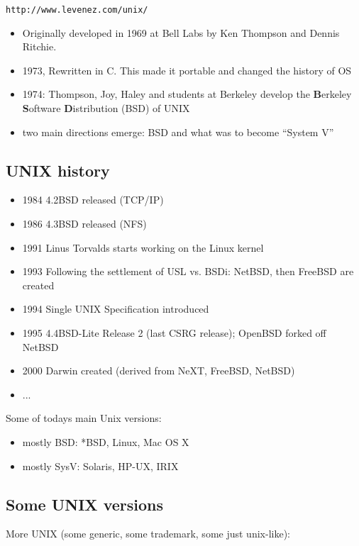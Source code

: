 \documentclass[xga]{xdvislides}
\begin{document}
\verb+http://www.levenez.com/unix/+
\\

\begin{itemize}
	\item Originally developed in 1969 at Bell Labs by Ken Thompson
		and Dennis Ritchie.
	\item 1973, Rewritten in C. This made it portable and changed the history of OS
	\item 1974: Thompson, Joy, Haley and students at Berkeley develop
		the {\bf B}erkeley {\bf S}oftware {\bf D}istribution (BSD) of UNIX
	\item two main directions emerge: BSD and what was to become ``System V''
\end{itemize}

\subsection{UNIX history}
\begin{itemize}
	\item 1984 4.2BSD released (TCP/IP)
	\item 1986 4.3BSD released (NFS)
	\item 1991 Linus Torvalds starts working on the Linux kernel
	\item 1993 Following the settlement of USL vs. BSDi: NetBSD, then FreeBSD are created
	\item 1994 Single UNIX Specification introduced
	\item 1995 4.4BSD-Lite Release 2 (last CSRG release); OpenBSD
		forked off NetBSD
	\item 2000 Darwin created (derived from NeXT, FreeBSD, NetBSD)
	\item ...
\end{itemize}

Some of todays main Unix versions:
\begin{itemize}
	\item mostly BSD: *BSD, Linux, Mac OS X
	\item mostly SysV: Solaris, HP-UX, IRIX
\end{itemize}

\subsection{Some UNIX versions}
More UNIX (some generic, some trademark, some just unix-like):
\\
\end{document}
